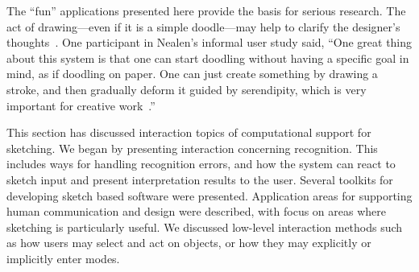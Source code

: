 The ``fun'' applications presented here provide the basis for serious
research. The act of drawing---even if it is a simple doodle---may
help to clarify the designer's
thoughts~\cite{cross-natural-intelligence}.  One participant in
Nealen's informal user study said, ``One great thing about this system is
that one can start doodling without having a specific goal in mind, as
if doodling on paper. One can just create something by drawing a
stroke, and then gradually deform it guided by serendipity, which is
very important for creative work~\cite{nealen-fibermesh}.'' 

\vspace{12pt}

This section has discussed interaction topics of computational support
for sketching. We began by presenting interaction concerning
recognition. This includes ways for handling recognition errors, and
how the system can react to sketch input and present interpretation
results to the user. Several toolkits for developing sketch based
software were presented. Application areas for supporting human
communication and design were described, with focus on areas where
sketching is particularly useful. We discussed low-level interaction
methods such as how users may select and act on objects, or how they
may explicitly or implicitly enter modes.
